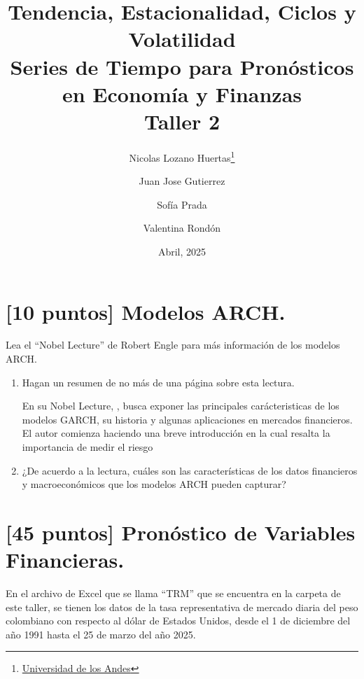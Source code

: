 \documentclass{article}
\title{\textbf{Tendencia, Estacionalidad, Ciclos y Volatilidad} \\ {\Large Series de Tiempo para Pron\'osticos en Econom\'ia y Finanzas} \\ {\large Taller 2}}
\author{Nicolas Lozano Huertas\thanks{\href{mailto:n.lozanoh@uniandes.edu.co?subject= Taller 2 Series de Tiempo}{Universidad de los Andes}} \and Juan Jose Gutierrez \and Sof\'ia Prada \and Valentina Rond\'on}
\date{Abril, 2025}
\theoremstyle{remark}
\theoremstyle{definition}
\begin{document}
\maketitle
\vspace{-1 cm}
\section{[10 puntos] Modelos ARCH.}
{Lea el ``Nobel Lecture'' de Robert Engle para m\'as informaci\'on de los modelos ARCH.}
\begin{enumerate}[label = \emph{\alph*})]
    \item {Hagan un resumen de no m\'as de una p\'agina sobre esta lectura.}
        \begin{tcolorbox}[title=Soluci\'on 1.a]
            En su Nobel Lecture, \cite{engle2004}, busca exponer las principales car\'acteristicas de los modelos GARCH, su historia y algunas aplicaciones en mercados financieros. \\
            El autor comienza haciendo una breve introducci\'on en la cual resalta la importancia de medir el riesgo 
        \end{tcolorbox}
    \item {¿De acuerdo a la lectura, cu\'ales son las caracter\'isticas de los datos financieros y macroecon\'omicos que los modelos ARCH pueden capturar?}
        \begin{tcolorbox}[title=Soluci\'on 1.b]
            
        \end{tcolorbox}
\end{enumerate}

\section{[45 puntos] Pron\'ostico de Variables Financieras.}

{En el archivo de Excel que se llama ``TRM'' que se encuentra en la carpeta de este taller, se tienen los datos de la tasa representativa de mercado diaria del peso colombiano con respecto al d\'olar de Estados Unidos, desde el 1 de diciembre del año 1991 hasta el 25 de marzo del año 2025.}
\end{document}
